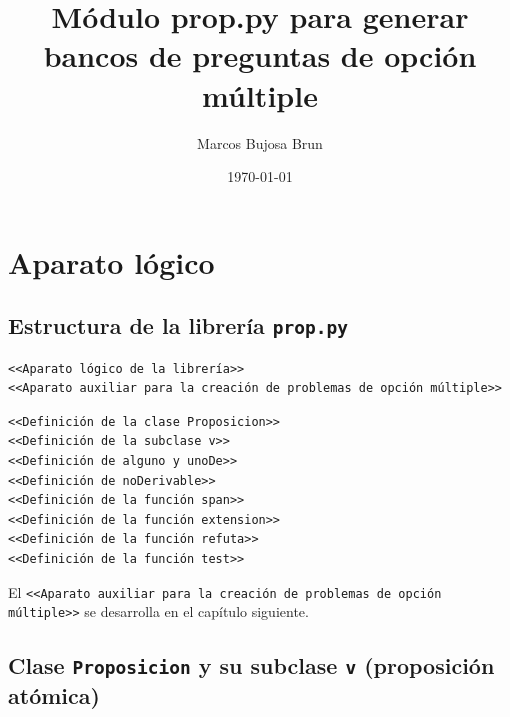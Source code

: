 \documentclass[10pt,a4paper]{report}
\author{Marcos Bujosa Brun}
\date{\today}
\title{Módulo prop.py para generar bancos de preguntas de opción múltiple}
\begin{document}
\tableofcontents

\part{Aparato lógico}
\label{sec:org59c8a85}

\chapter{Estructura de la librería \texttt{prop.py}}
\label{sec:orgf2bd270}

\begin{verbatim}
<<Aparato lógico de la librería>>
<<Aparato auxiliar para la creación de problemas de opción múltiple>>
\end{verbatim}

\begin{verbatim}
<<Definición de la clase Proposicion>>
<<Definición de la subclase v>>
<<Definición de alguno y unoDe>>
<<Definición de noDerivable>>
<<Definición de la función span>>
<<Definición de la función extension>>
<<Definición de la función refuta>>
<<Definición de la función test>>
\end{verbatim}

El \texttt{<{}<{}Aparato auxiliar para la creación de problemas de opción múltiple>{}>{}}
se desarrolla en el capítulo siguiente.
\chapter{Clase \texttt{Proposicion} y su subclase \texttt{v} (proposición atómica)}
\label{sec:orgd9cf297}
\end{document}
